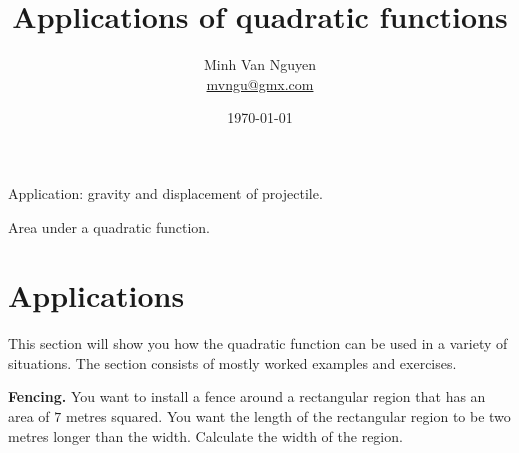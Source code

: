 \documentclass[a4paper,oneside,12pt]{article}
\begin{document}
\title{\Large\bf Applications of quadratic functions}
\author{%
  Minh Van Nguyen \\
  \url{mvngu@gmx.com}
}
\date{\today}
\maketitle


\begin{packeditem}
\item Application: gravity and displacement of projectile.

\item Area under a quadratic function.
\end{packeditem}



\section{Applications}

This section will show you how the quadratic function can be used in a
variety of situations.  The section consists of mostly worked examples
and exercises.

\begin{example}
\textbf{Fencing.}
\label{ex:fence_a_rectangular_region}
You want to install a fence around a rectangular region that has an
area of $7$ metres squared.  You want the length of the rectangular
region to be two metres longer than the width.  Calculate the width of
the region.
\end{example}
\end{document}

